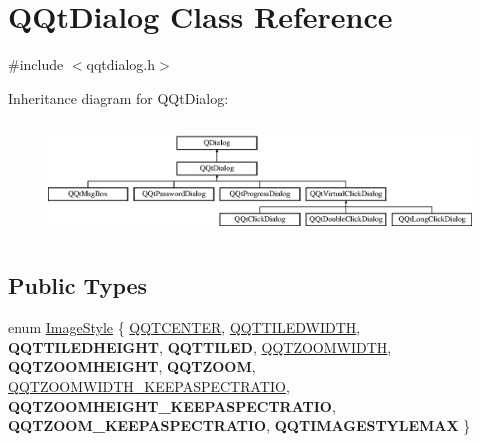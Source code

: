 \hypertarget{class_q_qt_dialog}{}\section{Q\+Qt\+Dialog Class Reference}
\label{class_q_qt_dialog}


{\ttfamily \#include $<$qqtdialog.\+h$>$}

Inheritance diagram for Q\+Qt\+Dialog\+:\begin{figure}[H]
\begin{center}
\leavevmode
\includegraphics[height=3.047619cm]{class_q_qt_dialog}
\end{center}
\end{figure}
\subsection*{Public Types}
\begin{DoxyCompactItemize}
\item 
enum \mbox{\hyperlink{class_q_qt_dialog_a00b7022121843af66df90371b9317412}{Image\+Style}} \{ \newline
\mbox{\hyperlink{class_q_qt_dialog_a00b7022121843af66df90371b9317412ae861c4431ada9691dad3eb7bdd101e18}{Q\+Q\+T\+C\+E\+N\+T\+ER}}, 
\mbox{\hyperlink{class_q_qt_dialog_a00b7022121843af66df90371b9317412a9a4ea72f0126e0d8ae1d218187c61d19}{Q\+Q\+T\+T\+I\+L\+E\+D\+W\+I\+D\+TH}}, 
{\bfseries Q\+Q\+T\+T\+I\+L\+E\+D\+H\+E\+I\+G\+HT}, 
{\bfseries Q\+Q\+T\+T\+I\+L\+ED}, 
\newline
\mbox{\hyperlink{class_q_qt_dialog_a00b7022121843af66df90371b9317412a97f7df5dae9533703745de33ea35efb6}{Q\+Q\+T\+Z\+O\+O\+M\+W\+I\+D\+TH}}, 
{\bfseries Q\+Q\+T\+Z\+O\+O\+M\+H\+E\+I\+G\+HT}, 
{\bfseries Q\+Q\+T\+Z\+O\+OM}, 
\mbox{\hyperlink{class_q_qt_dialog_a00b7022121843af66df90371b9317412ae0e28380d32c14e40028c6b5c76f2361}{Q\+Q\+T\+Z\+O\+O\+M\+W\+I\+D\+T\+H\+\_\+\+K\+E\+E\+P\+A\+S\+P\+E\+C\+T\+R\+A\+T\+IO}}, 
\newline
{\bfseries Q\+Q\+T\+Z\+O\+O\+M\+H\+E\+I\+G\+H\+T\+\_\+\+K\+E\+E\+P\+A\+S\+P\+E\+C\+T\+R\+A\+T\+IO}, 
{\bfseries Q\+Q\+T\+Z\+O\+O\+M\+\_\+\+K\+E\+E\+P\+A\+S\+P\+E\+C\+T\+R\+A\+T\+IO}, 
{\bfseries Q\+Q\+T\+I\+M\+A\+G\+E\+S\+T\+Y\+L\+E\+M\+AX}
 \}
\end{DoxyCompactItemize}
